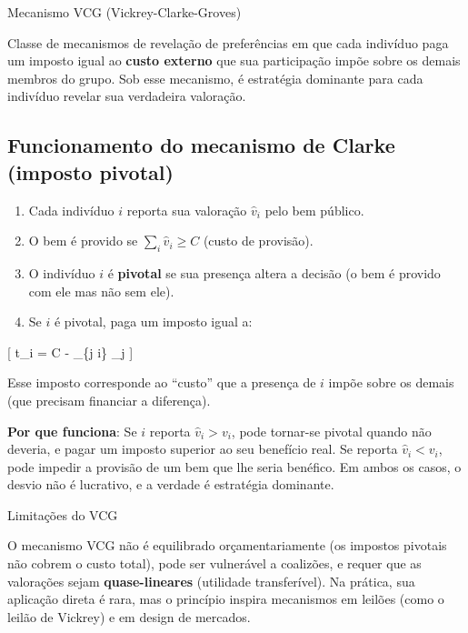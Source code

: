 \documentclass[11pt,twoside,openright]{book}
\providecommand{\tightlist}{\setlength{\itemsep}{0pt}\setlength{\parskip}{0pt}}
\begin{document}
\begin{definitionbox}{Mecanismo VCG (Vickrey-Clarke-Groves)}

Classe de mecanismos de revelação de preferências em que cada indivíduo
paga um imposto igual ao \textbf{custo externo} que sua participação
impõe sobre os demais membros do grupo. Sob esse mecanismo, é estratégia
dominante para cada indivíduo revelar sua verdadeira valoração.

\end{definitionbox}

\subsection{Funcionamento do mecanismo de Clarke (imposto
pivotal)}\label{funcionamento-do-mecanismo-de-clarke-imposto-pivotal}

\begin{enumerate}
\def\labelenumi{\arabic{enumi}.}
\tightlist
\item
  Cada indivíduo \(i\) reporta sua valoração \(\hat{v}_i\) pelo bem
  público.
\item
  O bem é provido se \(\sum_i \hat{v}_i \geq C\) (custo de provisão).
\item
  O indivíduo \(i\) é \textbf{pivotal} se sua presença altera a decisão
  (o bem é provido com ele mas não sem ele).
\item
  Se \(i\) é pivotal, paga um imposto igual a:
\end{enumerate}

{[} t\_i = C - \sum\_\{j \neq i\} \_j \label{eq:20.14}
 {]}

Esse imposto corresponde ao ``custo'' que a presença de \(i\) impõe
sobre os demais (que precisam financiar a diferença).

\textbf{Por que funciona}: Se \(i\) reporta \(\hat{v}_i > v_i\), pode
tornar-se pivotal quando não deveria, e pagar um imposto superior ao seu
benefício real. Se reporta \(\hat{v}_i < v_i\), pode impedir a provisão
de um bem que lhe seria benéfico. Em ambos os casos, o desvio não é
lucrativo, e a verdade é estratégia dominante.

\begin{notebox}{Limitações do VCG}

O mecanismo VCG não é equilibrado orçamentariamente (os impostos
pivotais não cobrem o custo total), pode ser vulnerável a coalizões, e
requer que as valorações sejam \textbf{quase-lineares} (utilidade
transferível). Na prática, sua aplicação direta é rara, mas o princípio
inspira mecanismos em leilões (como o leilão de Vickrey) e em design de
mercados.

\end{notebox}
\end{document}
